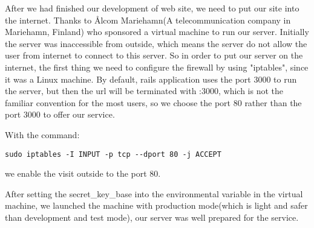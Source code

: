 After we had finished our development of web site, we need to put our site into the internet. Thanks to Ålcom Mariehamn(A telecommunication company in Mariehamn, Finland) who sponsored a virtual machine to run our server. Initially the server was inaccessible from outside, which means the server do not allow the user from internet to connect to this server. So in order to put our server on the internet, the first thing we need to configure the firewall by using "iptables", since it was a Linux machine. By default, rails application uses the port 3000 to run the server, but then the url will be terminated with :3000, which is not the familiar convention for the most users, so we choose the port 80 rather than the port 3000 to offer our service. 

With the command:
\begin{lstlisting}
sudo iptables -I INPUT -p tcp --dport 80 -j ACCEPT
\end{lstlisting}
we enable the visit outside to the port 80.

After setting the secret\_key\_base into the environmental variable in the virtual machine, we launched the machine with production mode(which is light and safer than development and test mode), our server was well prepared for the service.